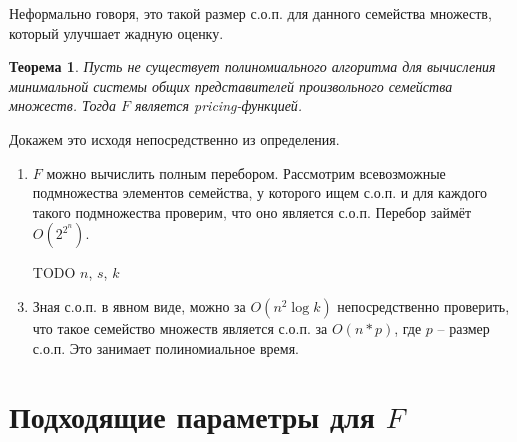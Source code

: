 \documentclass{article}
\newtheorem*{theorem}{Теорема}
\begin{document}
    Неформально говоря, это такой размер с.о.п. для данного семейства множеств, который улучшает жадную оценку.


\begin{theorem}
    Пусть не существует полиномиального алгоритма для вычисления минимальной системы общих представителей произвольного семейства множеств. Тогда $F$ является pricing-функцией. 
\end{theorem}

Докажем это исходя непосредственно из определения.
\begin{enumerate}
\item $F$ можно вычислить полным перебором. Рассмотрим всевозможные подмножества элементов семейства, у которого ищем с.о.п. и для каждого такого подмножества проверим, что оно является с.о.п. Перебор займёт $O(2^{2^n})$. 
\item [TODO] $n$, $s$, $k$
\item Зная с.о.п. в явном виде, можно за $O(n^2 \log k)$ непосредственно проверить, что такое семейство множеств является с.о.п. за $O(n * p)$, где $p$ -- размер с.о.п. Это занимает полиномиальное время.
\end{enumerate}

\section{Подходящие параметры для $F$}
\end{document}
